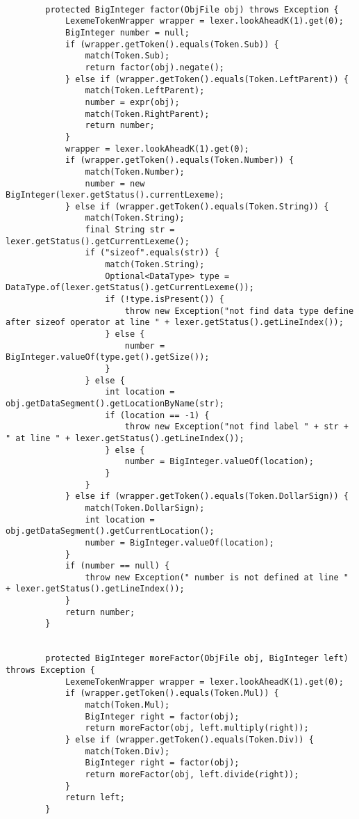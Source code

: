\documentclass[12pt]{extarticle}
\begin{document}
\begin{enumerate}
\begin{lstlisting}
    
        protected BigInteger factor(ObjFile obj) throws Exception {
            LexemeTokenWrapper wrapper = lexer.lookAheadK(1).get(0);
            BigInteger number = null;
            if (wrapper.getToken().equals(Token.Sub)) {
                match(Token.Sub);
                return factor(obj).negate();
            } else if (wrapper.getToken().equals(Token.LeftParent)) {
                match(Token.LeftParent);
                number = expr(obj);
                match(Token.RightParent);
                return number;
            }
            wrapper = lexer.lookAheadK(1).get(0);
            if (wrapper.getToken().equals(Token.Number)) {
                match(Token.Number);
                number = new BigInteger(lexer.getStatus().currentLexeme);
            } else if (wrapper.getToken().equals(Token.String)) {
                match(Token.String);
                final String str = lexer.getStatus().getCurrentLexeme();
                if ("sizeof".equals(str)) {
                    match(Token.String);
                    Optional<DataType> type = DataType.of(lexer.getStatus().getCurrentLexeme());
                    if (!type.isPresent()) {
                        throw new Exception("not find data type define after sizeof operator at line " + lexer.getStatus().getLineIndex());
                    } else {
                        number = BigInteger.valueOf(type.get().getSize());
                    }
                } else {
                    int location = obj.getDataSegment().getLocationByName(str);
                    if (location == -1) {
                        throw new Exception("not find label " + str + " at line " + lexer.getStatus().getLineIndex());
                    } else {
                        number = BigInteger.valueOf(location);
                    }
                }
            } else if (wrapper.getToken().equals(Token.DollarSign)) {
                match(Token.DollarSign);
                int location = obj.getDataSegment().getCurrentLocation();
                number = BigInteger.valueOf(location);
            }
            if (number == null) {
                throw new Exception(" number is not defined at line " + lexer.getStatus().getLineIndex());
            }
            return number;
        }
    
    
        protected BigInteger moreFactor(ObjFile obj, BigInteger left) throws Exception {
            LexemeTokenWrapper wrapper = lexer.lookAheadK(1).get(0);
            if (wrapper.getToken().equals(Token.Mul)) {
                match(Token.Mul);
                BigInteger right = factor(obj);
                return moreFactor(obj, left.multiply(right));
            } else if (wrapper.getToken().equals(Token.Div)) {
                match(Token.Div);
                BigInteger right = factor(obj);
                return moreFactor(obj, left.divide(right));
            }
            return left;
        }
    

\end{lstlisting}
\end{enumerate}
\end{document}
